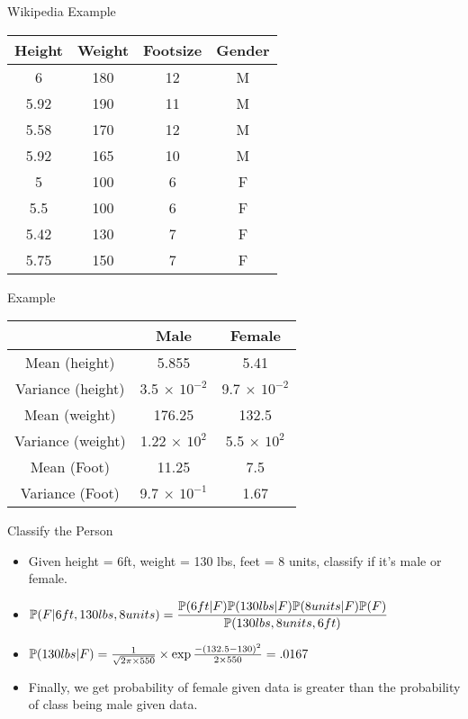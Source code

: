 \documentclass{beamer}
\begin{document}
\begin{frame}{Wikipedia Example}

    \begin{center}
    \begin{tabular}{|c|c|c|c|}
    \hline
    Height&Weight&Footsize&Gender\\
    \hline
    \hline
         6 & 180& 12& M \\
         5.92 & 190& 11& M \\
         5.58 & 170& 12& M \\
         5.92 & 165& 10& M \\
         5 & 100& 6& F \\
         5.5 & 100& 6& F \\
         5.42 & 130& 7& F \\
         5.75 & 150& 7& F \\
         \hline
    \end{tabular}
    
    \end{center}
    
\end{frame}

\begin{frame}{Example}
    \begin{center}
        
    
    \begin{tabular}{|c|c|c|}
    \hline
     &Male&Female\\
     \hline
     \hline
     Mean (height) & 5.855 & 5.41  \\
     Variance (height) & 3.5 $\times$ $10^{-2}$ & 9.7 $\times$ $10^{-2}$  \\
     Mean (weight) & 176.25 & 132.5  \\
     Variance (weight) & 1.22 $\times$ $10^{2}$ & 5.5 $\times$ $10^{2}$   \\
     Mean (Foot) & 11.25 & 7.5  \\
     Variance (Foot) & 9.7 $\times$ $10^{-1}$ & 1.67  \\
    \hline
    \hline
    \end{tabular}
    \end{center}
\end{frame}


\begin{frame}{Classify the Person}
    \begin{itemize}[<+->]
        \item  Given height = 6ft, weight = 130 lbs, feet = 8 units, classify if it's male or female.
        \item $\mathbb{P}(F|6ft, 130 lbs, 8 units) = \dfrac{\mathbb{P}(6 ft|F)\mathbb{P}(130 lbs|F)\mathbb{P}(8 units|F)\mathbb{P}(F)}{\mathbb{P}(130 lbs, 8 units, 6 ft)}$
        \item $\mathbb{P}(130 lbs|F) = \frac{1}{\sqrt{2\pi\times 550}}\times \exp{\frac{-(132.5-130)^2}{2\times 550}} = .0167$
        \item Finally, we get probability of female given data is greater than the probability of class being male given data.

    \end{itemize}
    
\end{frame}
\end{document}
